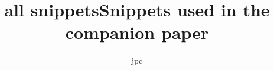 \documentclass{article}
\title{all snippets}
\author{jpc}
\title{Snippets used in the companion paper}
\begin{document}
\maketitle



\begin{alectryon}{\small \SnippetiicasymToiicinj}\end{alectryon}
\begin{alectryon}{\small \Snippetallnotation}\end{alectryon}
\begin{alectryon}{\small \SnippetChrel}\end{alectryon}
\begin{alectryon}{\small \SnippetLiftlemma}\end{alectryon}
\begin{alectryon}{\small \SnippetLiftnota}\end{alectryon}
\begin{alectryon}{\small \SnippetTCP}\end{alectryon}
\begin{alectryon}{\small \Snippetdsepnota}\end{alectryon}
\end{document}
